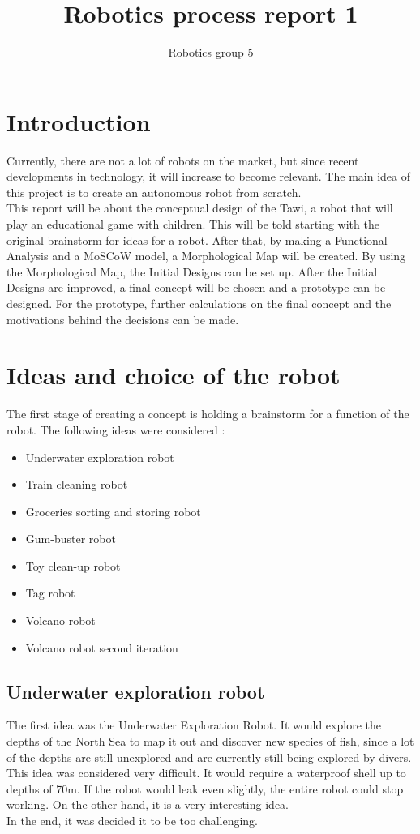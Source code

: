\documentclass[11pt,twoside,a4paper]{report}
\begin{document}
\title{Robotics process report 1}
\author{Robotics group 5}
\maketitle
\tableofcontents

\chapter{Introduction}
Currently, there are not a lot of robots on the market, but since recent developments in technology, it will increase to become relevant. The main idea of this project is to create an autonomous robot from scratch. \\
This report will be about the conceptual design of the Tawi, a robot that will play an educational game with children. This will be told starting with the original brainstorm for ideas for a robot. After that, by making a Functional Analysis and a MoSCoW model, a Morphological Map will be created. By using the Morphological Map, the Initial Designs can be set up. After the Initial Designs are improved, a final concept will be chosen and a prototype can be designed. For the prototype, further calculations on the final concept and the motivations behind the decisions can be made.

\chapter{Ideas and choice of the robot}
The first stage of creating a concept is holding a brainstorm for a function of the robot. The following ideas were considered : 
\begin{itemize}
\item{Underwater exploration robot}
\item{Train cleaning robot}
\item{Groceries sorting and storing robot}
\item{Gum-buster robot}
\item{Toy clean-up robot}
\item{Tag robot}
\item{Volcano robot}
\item{Volcano robot second iteration}
\end{itemize}

\section{Underwater exploration robot}
The first idea was the Underwater Exploration Robot. It would explore the depths of the North Sea to map it out and discover new species of fish, since a lot of the depths are still unexplored and are currently still being explored by divers. \\
This idea was considered very difficult. It would require a waterproof shell up to depths of 70m. If the robot would leak even slightly, the entire robot could stop working. On the other hand, it is a very interesting idea. \\
In the end, it was decided it to be too challenging.
\end{document}
